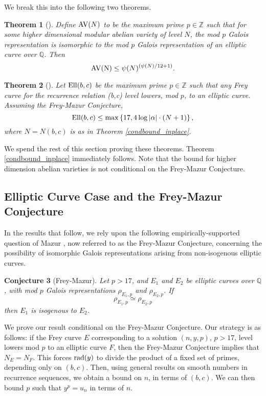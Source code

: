 \documentclass[12pt]{amsart}
\newtheorem{thm}{Theorem}[section]
\newtheorem{conj}[thm]{Conjecture}
\theoremstyle{definition}
\theoremstyle{remark}
\def\Q{{\mathbb Q}}
\def\Z{{\mathbb Z}}
\newcommand{\rad}{{\rm{rad}}}
\newcommand{\Ell}{\rm{Ell}}
\newcommand{\AV}{\rm{AV}}
\begin{document}
\noindent
We break this into the following two theorems.

\begin{thm}[]\label{bound_av}
Define ${\AV}(N)$ to be the maximum prime $p \in \Z$ such that for some higher dimensional modular abelian variety of level $N$, the mod $p$ Galois representation is isomorphic to the mod $p$ Galois representation of an elliptic curve over $\Q$.  Then
\[{\AV(N)} \leq \psi(N)^{(\psi(N)/12+1)}. \]
\end{thm}

\begin{thm}[]\label{bound_ell}
Let ${\Ell}(b,c)$ be the maximum prime $p \in \Z$ such that any Frey curve for the recurrence relation (b,c) level lowers, mod $p$, to an elliptic curve.  Assuming the Frey-Mazur Conjecture, 
\[{\Ell}(b,c) \leq \max\left\{17, 4\log{|\alpha|} \cdot (N+1) \right\}, \]
where $N = N(b,c)$ is as in Theorem \ref{condbound_inplace}.
\end{thm}


We spend the rest of this section proving these theorems. Theorem \ref{condbound_inplace} immediately follows.  Note that the bound for higher dimension abelian varieties is not conditional on the Frey-Mazur Conjecture.



\subsection{Elliptic Curve Case and the Frey-Mazur Conjecture}\label{fm}

In the results that follow, we rely upon the following empirically-supported question of Mazur \cite{mazur78}, now referred to as the Frey-Mazur Conjecture, concerning the possibility of isomorphic Galois representations arising from non-isogenous elliptic curves.

\begin{conj}[Frey-Mazur]\label{FreyMazur}
Let $p > 17$, and $E_1$ and $E_2$ be elliptic curves over $\Q$, with mod $p$ Galois representations $\rho_{E_1,p}$ and $\rho_{E_2,p}$.  If
\[ \rho_{E_1,p} \simeq \rho_{E_2,p} \]
then $E_1$ is isogenous to $E_2$.
\end{conj}

We prove our result conditional on the Frey-Mazur Conjecture. Our strategy is as follows: if the Frey curve $E$ corresponding to a solution $(n,y,p)$, $p > 17$, level lowers mod $p$ to an elliptic curve $F$, then the Frey-Mazur Conjecture implies that $N_E = N_F$. This forces $\rad(y)$ to divide the product of a fixed set of primes, depending only on $(b,c)$. Then, using general results on smooth numbers in recurrence sequences, we obtain a bound on $n$, in terms of $(b,c)$. We can then bound $p$ such that $y^p = u_n$ in terms of $n$.
\end{document}
